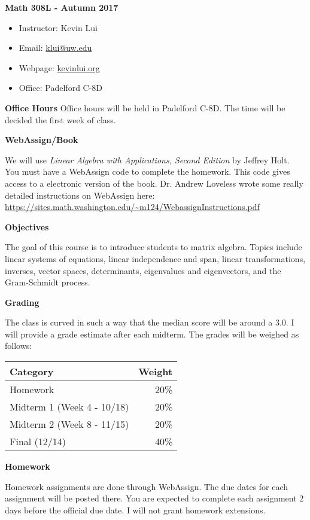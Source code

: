 \documentclass{article}
\begin{document}
\textbf{\huge  Math 308L - Autumn 2017 }
\begin{itemize}
    \item
        Instructor: Kevin Lui
    \item
        Email: \href{mailto:klui@uw.edu}{klui@uw.edu}
    \item
        Webpage: \url{kevinlui.org}
    \item
        Office: Padelford C-8D
\end{itemize}

\textbf{Office Hours}
Office hours will be held in Padelford C-8D. The time will be decided the first
week of class.

\textbf{WebAssign/Book}

We will use \textit{Linear Algebra with Applications, Second Edition} by
Jeffrey Holt. You must have a WebAssign code to complete the homework. This
code gives access to a electronic version of the book. Dr. Andrew Loveless
wrote some really detailed instructions on WebAssign here:
\url{https://sites.math.washington.edu/~m124/WebassignInstructions.pdf}

\textbf{Objectives}

The goal of this course is to introduce students to matrix algebra. Topics
include linear systems of equations, linear independence and span, linear
transformations, inverses, vector spaces, determinants, eigenvalues and
eigenvectors, and the Gram-Schmidt process.

\textbf{Grading}

The class is curved in such a way that the median score will be around a 3.0. I
will provide a grade estimate after each midterm.  The grades will be weighed
as follows:

\begin{tabular}{ l r }
    Category  & Weight   \\
    \hline
    Homework  & 20\%      \\
    Midterm 1 (Week 4 - 10/18) & 20\%      \\
    Midterm 2 (Week 8 - 11/15) & 20\%      \\
    Final (12/14)    & 40\%
\end{tabular}

\textbf{Homework}

Homework assignments are done through WebAssign. The due dates for each
assignment will be posted there. You are expected to complete each assignment 2
days before the official due date. I will not grant homework extensions.
\end{document}
